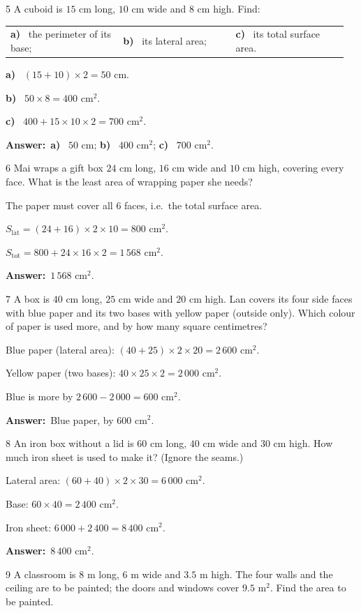 \documentclass[11pt]{article}
\makeatletter
\newif\ifsol \solfalse
\renewcommand{\arraystretch}{1.35}
\providecommand{\AnsWord}{Đáp số}
\newcommand{\dapso}[1]{\par\textbf{\AnsWord:}\ #1}
\newcommand{\probsol}[1]{%
  \begin{lrbox}{\solmeasure}\begin{minipage}{\dimexpr\linewidth-24pt\relax}#1\end{minipage}\end{lrbox}%
  \ifsol
    \begin{solbox}#1\end{solbox}%
  \else
    \setlength{\solht}{\dimexpr\ht\solmeasure+\dp\solmeasure+0.85cm\relax}%
    \ifdim\solht<1.35cm\setlength{\solht}{1.35cm}\fi
    \begin{tcolorbox}[colback=white,colframe=Line,boxrule=0.8pt,arc=5pt,
      left=8pt,right=8pt,top=4pt,bottom=4pt,height=\solht]{\footnotesize\color{Slate}\itshape\WorkWord}\end{tcolorbox}%
  \fi}
\newcommand{\pa}[1]{\textbf{#1)}\ }
\newenvironment{cols3}{\par\vspace{3pt}\noindent\setlength{\tabcolsep}{0pt}\renewcommand{\arraystretch}{1.3}%
  \begin{tabular}{@{}>{\raggedright\arraybackslash\rule{0pt}{4.4ex}}p{0.32\linewidth}<{\rule[-2.3ex]{0pt}{0pt}}@{\hspace{0.015\linewidth}}>{\raggedright\arraybackslash\rule{0pt}{4.4ex}}p{0.32\linewidth}<{\rule[-2.3ex]{0pt}{0pt}}@{\hspace{0.015\linewidth}}>{\raggedright\arraybackslash\rule{0pt}{4.4ex}}p{0.32\linewidth}<{\rule[-2.3ex]{0pt}{0pt}}@{}}}%
  {\end{tabular}\par}
\newcommand{\gap}{\vspace{0.3cm}}
\def\WorkWord{Your work:}
\def\AnsWord{Answer}
\makeatother
\begin{document}
\gap
\begin{probbox}{5}{\relax}
A cuboid is $15$ cm long, $10$ cm wide and $8$ cm high. Find:
\begin{cols3}
\pa{a} the perimeter of its base; & \pa{b} its lateral area; & \pa{c} its total surface area.
\end{cols3}
\end{probbox}
\probsol{
\pa{a} $(15+10)\times2=50$ cm.\par
\pa{b} $50\times8=400$ cm$^2$.\par
\pa{c} $400+15\times10\times2=700$ cm$^2$.
\dapso{\pa{a} $50$ cm; \pa{b} $400$ cm$^2$; \pa{c} $700$ cm$^2$.}}
\gap
\begin{probbox}{6}{\relax}
Mai wraps a gift box $24$ cm long, $16$ cm wide and $10$ cm high, covering every face. What is the least area of wrapping paper she needs?
\end{probbox}
\probsol{
The paper must cover all $6$ faces, i.e.\ the total surface area.\par
$S_{\text{lat}}=(24+16)\times2\times10=800$ cm$^2$.\par
$S_{\text{tot}}=800+24\times16\times2=1\,568$ cm$^2$.
\dapso{$1\,568$ cm$^2$.}}
\gap
\begin{probbox}{7}{\relax}
A box is $40$ cm long, $25$ cm wide and $20$ cm high. Lan covers its four side faces with blue paper and its two bases with yellow paper (outside only). Which colour of paper is used more, and by how many square centimetres?
\end{probbox}
\probsol{
Blue paper (lateral area): $(40+25)\times2\times20=2\,600$ cm$^2$.\par
Yellow paper (two bases): $40\times25\times2=2\,000$ cm$^2$.\par
Blue is more by $2\,600-2\,000=600$ cm$^2$.
\dapso{Blue paper, by $600$ cm$^2$.}}
\gap
\begin{probbox}{8}{\relax}
An iron box without a lid is $60$ cm long, $40$ cm wide and $30$ cm high. How much iron sheet is used to make it? (Ignore the seams.)
\end{probbox}
\probsol{
Lateral area: $(60+40)\times2\times30=6\,000$ cm$^2$.\par
Base: $60\times40=2\,400$ cm$^2$.\par
Iron sheet: $6\,000+2\,400=8\,400$ cm$^2$.
\dapso{$8\,400$ cm$^2$.}}
\gap
\begin{probbox}{9}{\relax}
A classroom is $8$ m long, $6$ m wide and $3.5$ m high. The four walls and the ceiling are to be painted; the doors and windows cover $9.5$ m$^2$. Find the area to be painted.
\end{probbox}
\end{document}

